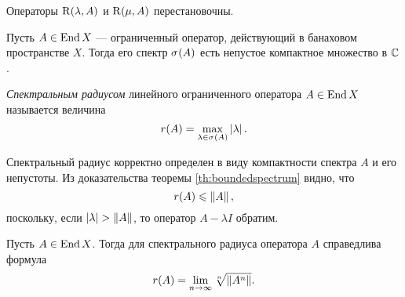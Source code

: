 \begin{corollary}
    Операторы $\operatorname{R}(\lambda, A)$ и $\operatorname{R}(\mu, A)$ перестановочны.
\end{corollary}

\begin{theorem}\label{th:boundedspectrum}
    \indent Пусть $A \in \operatorname{End} X$ --- ограниченный оператор, действующий в банаховом пространстве $X$.
    Тогда его спектр $\spectrum{A}$ есть непустое компактное множество в $\mathbb{C}$.
\end{theorem}

\begin{definition}
    \emph{Спектральным радиусом} линейного ограниченного оператора $A \in \operatorname{End} X$ называется величина
    \[ r(A) = \max_{\lambda \in \spectrum{A}} \absv{\lambda}. \]
\end{definition}

Спектральный радиус корректно определен в виду компактности спектра $A$ и его непустоты.
Из доказательства теоремы \ref{th:boundedspectrum} видно, что
\[ r(A) \leqslant \left\|A\right\|, \]
поскольку, если $\left|\lambda\right| > \left\|A\right\|$, то оператор $A- \lambda I$ обратим.

\begin{theorem}
    Пусть $A \in \operatorname{End} X$. Тогда для спектрального радиуса оператора $A$ справедлива формула
    \[ r(A) = \lim_{n\to \infty} \sqrt[n]{\left\|A^n\right\|}. \]
\end{theorem}
